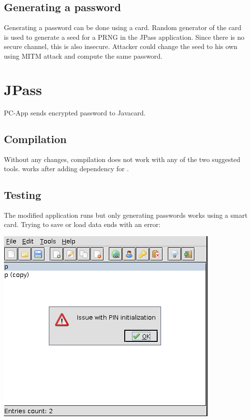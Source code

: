 \documentclass[paper=a4, fontsize=12pt]{scrartcl}
\begin{document}
\subsection{Generating a password}
Generating a password can be done using a card.
Random generator of the card is used to generate a seed for a PRNG in the JPass application.
Since there is no secure channel, this is also insecure.
Attacker could change the seed to his own using MITM attack and compute the same password.

\section{JPass}
PC-App sends encrypted password to Javacard. %

\subsection{Compilation}
Without any changes, compilation does not work with any of the two suggested tools.
\verb@Maven@ works after adding dependency for \verb@jcardsim@.

\subsection{Testing}
The modified application runs but only generating passwords works using a smart card.
Trying to save or load data ends with an error:

\includegraphics[scale=0.5]{jpass_error}
\end{document}
